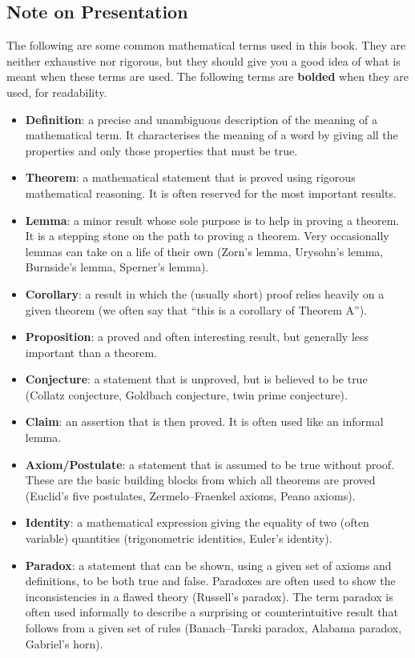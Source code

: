 \subsection*{Note on Presentation}
The following are some common mathematical terms used in this book. They are neither exhaustive nor rigorous, but they should give you a good idea of what is meant when these terms are used. The following terms are \textbf{bolded} when they are used, for readability.
\begin{itemize}
\item \textbf{Definition}: a precise and unambiguous description of the meaning of a mathematical term. It characterises the meaning of a word by giving all the properties and only those properties that must be true.
\item \textbf{Theorem}: a mathematical statement that is proved using rigorous mathematical reasoning. It is often reserved for the most important results.
\item \textbf{Lemma}: a minor result whose sole purpose is to help in proving a theorem. It is a stepping stone on the path to proving a theorem. Very occasionally lemmas can take on a life of their own (Zorn's lemma, Urysohn's lemma, Burnside's lemma, Sperner's lemma).
\item \textbf{Corollary}: a result in which the (usually short) proof relies heavily on a given theorem (we often say that ``this is a corollary of Theorem A'').
\item \textbf{Proposition}: a proved and often interesting result, but generally less important than a theorem.
\item \textbf{Conjecture}: a statement that is unproved, but is believed to be true (Collatz conjecture, Goldbach conjecture, twin prime conjecture).
\item \textbf{Claim}: an assertion that is then proved. It is often used like an informal lemma.
\item \textbf{Axiom/Postulate}: a statement that is assumed to be true without proof. These are the basic building blocks from which all theorems are proved (Euclid's five postulates, Zermelo--Fraenkel axioms, Peano axioms).
\item \textbf{Identity}: a mathematical expression giving the equality of two (often variable) quantities (trigonometric identities, Euler's identity).
\item \textbf{Paradox}: a statement that can be shown, using a given set of axioms and definitions, to be both true and false. Paradoxes are often used to show the inconsistencies in a flawed theory (Russell's paradox). The term paradox is often used informally to describe a surprising or counterintuitive result that follows from a given set of rules (Banach--Tarski paradox, Alabama paradox, Gabriel's horn).
\end{itemize}

